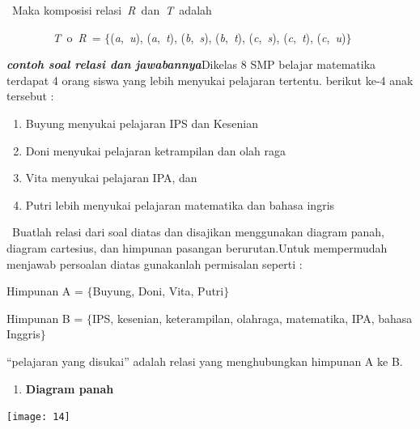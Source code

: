 \documentclass[11pt,fleqn]{book} %
\begin{document}
\begin{myEnumerate}
\begin{itemize}
\noindent {\O}~Maka komposisi relasi~\textit{R~}dan~\textit{T~}adalah

\noindent \textit{~~~~~~~~T~}$\mathrm{o}$~\textit{R~}= $\{$(\textit{a},~\textit{u}), (\textit{a},~\textit{t}), (\textit{b},~\textit{s}), (\textit{b},~\textit{t}), (\textit{c},~\textit{s}), (\textit{c},~\textit{t}), (\textit{c},~\textit{u})$\}$

\noindent 

\noindent \textbf{\textit{contoh soal relasi dan jawabannya}}Dikelas 8 SMP belajar matematika terdapat 4 orang siswa yang lebih menyukai pelajaran tertentu. berikut ke-4 anak tersebut :

\begin{enumerate}
\item  Buyung menyukai pelajaran IPS dan Kesenian

\item  Doni menyukai pelajaran ketrampilan dan olah raga

\item  Vita menyukai pelajaran IPA, dan

\item  Putri lebih menyukai pelajaran matematika dan bahasa ingris
\end{enumerate}

\noindent ~Buatlah relasi dari soal diatas dan disajikan menggunakan diagram panah, diagram cartesius, dan himpunan pasangan berurutan.\textit{}Untuk mempermudah menjawab persoalan diatas gunakanlah permisalan seperti :

\noindent 

\noindent Himpunan A = $\{$Buyung, Doni, Vita, Putri$\}$

\noindent Himpunan B = $\{$IPS, kesenian, keterampilan, olahraga, matematika, IPA, bahasa Inggris$\}$

\noindent ``pelajaran yang disukai'' adalah relasi yang menghubungkan himpunan A ke B.

\noindent 

\noindent 

\noindent 

\noindent 

\noindent 

\noindent 

\begin{enumerate}
\item  \textbf{Diagram panah}
\end{enumerate}

\begin{center}
\noindent \texttt{[image: 14]}~
\end{center}


\end{itemize}
\end{myEnumerate}
\end{document}
